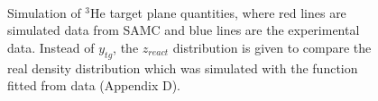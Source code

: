 \begin{figure}[!ht]
  \begin{center}
    \\
    \caption[Simulation of $\mathrm{^{3}He}$ target plane quantities]{\footnotesize{Simulation of $^{3}$He target plane quantities, where red lines are simulated data from SAMC and blue lines are the experimental data. Instead of $y_{tg}$, the $z_{react}$ distribution is given to compare the real density distribution which was simulated with the function fitted from data (Appendix D).}}
    \label{samc_tg_he3}
  \end{center}
\end{figure}

